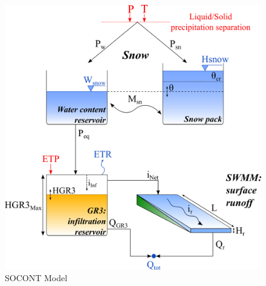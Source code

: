 \documentclass[
  letterpaper,
  DIV=11,
  numbers=noendperiod]{scrreprt}
\begin{document}
\begin{figure}

{\centering \includegraphics{./figures/fig-model_socont.png}

}

\caption{\label{fig-model_socont}SOCONT Model}

\end{figure}
\end{document}
